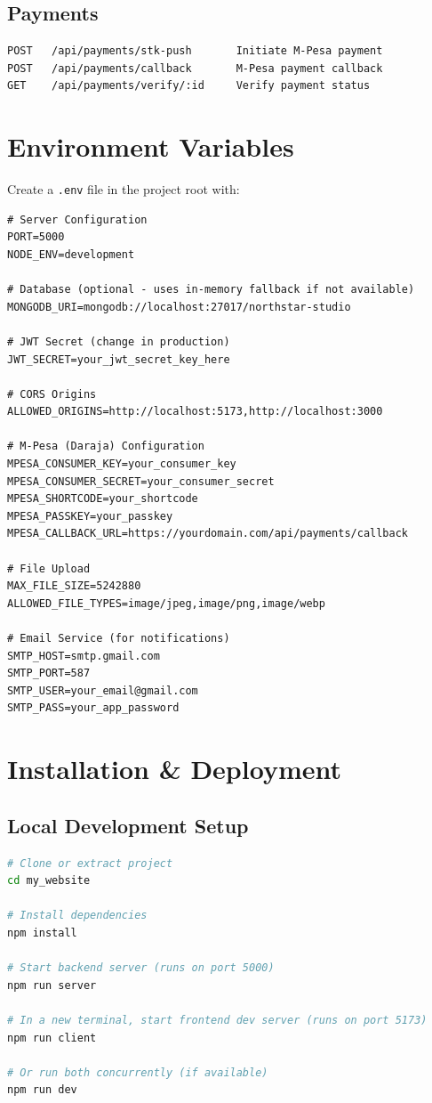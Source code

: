 \documentclass[12pt]{article}
\begin{document}
\subsection{Payments}

\begin{lstlisting}
POST   /api/payments/stk-push       Initiate M-Pesa payment
POST   /api/payments/callback       M-Pesa payment callback
GET    /api/payments/verify/:id     Verify payment status
\end{lstlisting}

\section{Environment Variables}

Create a \texttt{.env} file in the project root with:

\begin{lstlisting}
# Server Configuration
PORT=5000
NODE_ENV=development

# Database (optional - uses in-memory fallback if not available)
MONGODB_URI=mongodb://localhost:27017/northstar-studio

# JWT Secret (change in production)
JWT_SECRET=your_jwt_secret_key_here

# CORS Origins
ALLOWED_ORIGINS=http://localhost:5173,http://localhost:3000

# M-Pesa (Daraja) Configuration
MPESA_CONSUMER_KEY=your_consumer_key
MPESA_CONSUMER_SECRET=your_consumer_secret
MPESA_SHORTCODE=your_shortcode
MPESA_PASSKEY=your_passkey
MPESA_CALLBACK_URL=https://yourdomain.com/api/payments/callback

# File Upload
MAX_FILE_SIZE=5242880
ALLOWED_FILE_TYPES=image/jpeg,image/png,image/webp

# Email Service (for notifications)
SMTP_HOST=smtp.gmail.com
SMTP_PORT=587
SMTP_USER=your_email@gmail.com
SMTP_PASS=your_app_password
\end{lstlisting}

\section{Installation \& Deployment}

\subsection{Local Development Setup}

\begin{lstlisting}[language=bash]
# Clone or extract project
cd my_website

# Install dependencies
npm install

# Start backend server (runs on port 5000)
npm run server

# In a new terminal, start frontend dev server (runs on port 5173)
npm run client

# Or run both concurrently (if available)
npm run dev
\end{lstlisting}
\end{document}
